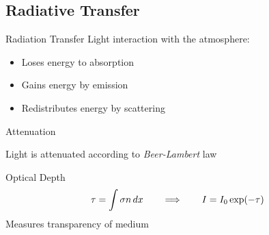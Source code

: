 \documentclass[compress,red,12pt]{beamer}
\begin{document}
\subsection{Radiative Transfer}

\begin{frame}[label=RT]{Radiation Transfer}
  Light interaction with the atmosphere:
  \begin{itemize}
  \item Loses energy to absorption
  \item Gains energy by emission
  \item Redistributes energy by scattering
  \end{itemize}
  \hfill\hyperlink{RTE}{}  
\end{frame}


\begin{frame}{Attenuation}
  \begin{block}{Light is attenuated according to {\em Beer-Lambert} law}
    \centerline{\def\svgwidth{0.6\columnwidth}\small{}}
  \end{block}
  {
    \begin{block}{Optical Depth}
      \begin{align*}
        \tau = \int \sigma n \,d{x} \qquad\Longrightarrow\qquad I=I_0 \exp(-\tau)
      \end{align*}
      Measures transparency of medium
    \end{block}
  }
\end{frame}

\end{document}
